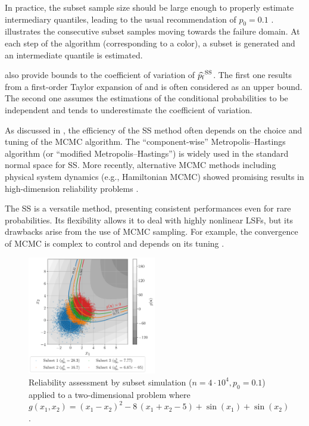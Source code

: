 
In practice, the subset sample size should be large enough to properly estimate intermediary quantiles, leading to the usual recommendation of $p_0=0.1$ \citep{AuBeck2001}. 
 illustrates the consecutive subset samples moving towards the failure domain. 
At each step of the algorithm (corresponding to a color), a subset is generated and an intermediate quantile is estimated.   

\cite{AuBeck2001} also provide bounds to the coefficient of variation of $\widehat{p_\mathrm{f}}^{\mathrm{SS}}$. 
The first one results from a first-order Taylor expansion of  and is often considered as an upper bound. 
The second one assumes the estimations of the conditional probabilities to be independent and tends to underestimate the coefficient of variation. 

As discussed in \citet{Papaioannou_PEM_2015}, the efficiency of the SS method often depends on the choice and tuning of the MCMC algorithm. 
The ``component-wise'' Metropolis–Hastings algorithm (or ``modified Metropolis–Hastings'') is widely used in the standard normal space for SS. 
More recently, alternative MCMC methods including physical system dynamics (e.g., Hamiltonian MCMC) showed promising results in high-dimension reliability problems \citep{papakonstantinou_2023_HMCMC}. 

The SS is a versatile method, presenting consistent performances even for rare probabilities. 
Its flexibility allows it to deal with highly nonlinear LSFs, but its drawbacks arise from the use of MCMC sampling. 
For example, the convergence of MCMC is complex to control and depends on its tuning \citep{roy_2020_mcmc_convergence}. %

\begin{figure}
    \centering
    \includegraphics[width=0.5\textwidth]{../numerical_experiments/chapter1/figures/reliability_SS_illustration.png}
    \caption{Reliability assessment by subset simulation ($n=4\cdot10^4, p_0 = 0.1$) applied to a two-dimensional problem where $g(x_1, x_2)=(x_1 - x_2) ^ 2 - 8 \, (x_1 + x_2 - 5) + \sin(x_1) + \sin(x_2)$.}
    \label{fig:SS_reliability}
\end{figure}


